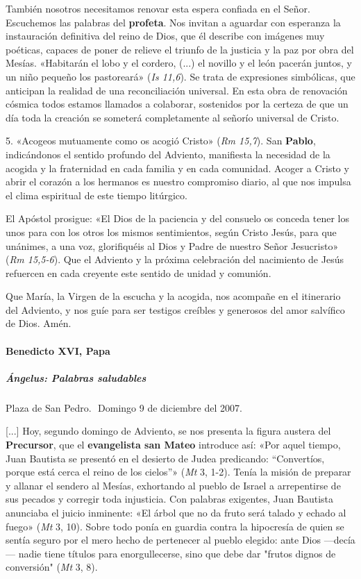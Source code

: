\documentclass[]{article}
\let\oldparagraph\paragraph
\renewcommand{\paragraph}[1]{\oldparagraph{#1}\mbox{}}
\let\oldsubparagraph\subparagraph
\renewcommand{\subparagraph}[1]{\oldsubparagraph{#1}\mbox{}}
\begin{document}
También nosotros necesitamos renovar esta espera confiada en el Señor.
Escuchemos las palabras del \textbf{profeta}. Nos invitan a aguardar con
esperanza la instauración definitiva del reino de Dios, que él describe
con imágenes muy poéticas, capaces de poner de relieve el triunfo de la
justicia y la paz por obra del Mesías. «Habitarán el lobo y el cordero,
(...) el novillo y el león pacerán juntos, y un niño pequeño los
pastoreará» (\emph{Is 11,6}). Se trata de expresiones simbólicas, que
anticipan la realidad de una reconciliación universal. En esta obra de
renovación cósmica todos estamos llamados a colaborar, sostenidos por la
certeza de que un día toda la creación se someterá completamente al
señorío universal de Cristo.

5. «Acogeos mutuamente como os acogió Cristo» (\emph{Rm 15,7}). San
\textbf{Pablo}, indicándonos el sentido profundo del Adviento,
manifiesta la necesidad de la acogida y la fraternidad en cada familia y
en cada comunidad. Acoger a Cristo y abrir el corazón a los hermanos es
nuestro compromiso diario, al que nos impulsa el clima espiritual de
este tiempo litúrgico.

El Apóstol prosigue: «El Dios de la paciencia y del consuelo os conceda
tener los unos para con los otros los mismos sentimientos, según Cristo
Jesús, para que unánimes, a una voz, glorifiquéis al Dios y Padre de
nuestro Señor Jesucristo» (\emph{Rm 15,5-6}). Que el Adviento y la
próxima celebración del nacimiento de Jesús refuercen en cada creyente
este sentido de unidad y comunión.

Que María, la Virgen de la escucha y la acogida, nos acompañe en el
itinerario del Adviento, y nos guíe para ser testigos creíbles y
generosos del amor salvífico de Dios. Amén.

\paragraph{Benedicto XVI, Papa}\label{benedicto-xvi-papa-1}

\subparagraph{Ángelus: Palabras
saludables}\label{uxe1ngelus-palabras-saludables}

Plaza de San Pedro.  Domingo 9 de diciembre del 2007.

{[}...{]} Hoy, segundo domingo de Adviento, se nos presenta la figura
austera del \textbf{Precursor}, que el \textbf{evangelista san Mateo}
introduce así: «Por aquel tiempo, Juan Bautista se presentó en el
desierto de Judea predicando: ``Convertíos, porque está cerca el reino
de los cielos''» (\emph{Mt} 3, 1-2). Tenía la misión de preparar y
allanar el sendero al Mesías, exhortando al pueblo de Israel a
arrepentirse de sus pecados y corregir toda injusticia. Con palabras
exigentes, Juan Bautista anunciaba el juicio inminente: «El árbol que no
da fruto será talado y echado al fuego» (\emph{Mt} 3, 10). Sobre todo
ponía en guardia contra la hipocresía de quien se sentía seguro por el
mero hecho de pertenecer al pueblo elegido: ante Dios ---decía--- nadie
tiene títulos para enorgullecerse, sino que debe dar "frutos dignos de
conversión" (\emph{Mt} 3, 8).
\end{document}
